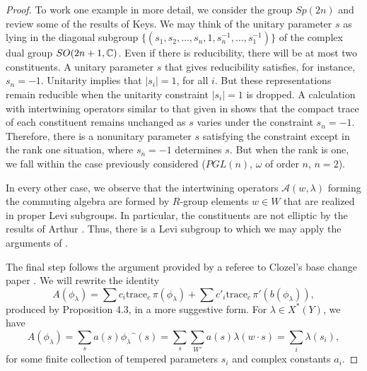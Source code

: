 \documentclass{amsart}
\begin{document}
\begin{proof}
To work one example in more detail, we consider the group $Sp(2n)$
and review some of the results of Keys.
We may
think of the unitary parameter $s$ as lying in the diagonal subgroup
$\{(s_1,s_2,\dots,s_n,1,s_n^{-1},\dots,s_1^{-1})\}$ of
the complex dual group $SO(2n+1,{\Bbb C})$. 
Even if there is reducibility, there will be at most
two constituents.
A unitary
parameter $s$ that gives reducibility satisfies, for instance, $s_n=-1$.
Unitarity implies that
$|s_i|=1$, for all $i$.  But these representations remain
reducible when the unitarity constraint $|s_i| = 1$ is dropped.
A calculation with intertwining operators similar to that
given in \cite{H1,2} shows that the compact trace of each constituent remains 
unchanged as $s$ varies under the constraint $s_n=-1$.
Therefore, there is a nonunitary parameter
$s$ satisfying the constraint except in the rank one situation, where
$s_n=-1$ determines $s$. 
But when the rank is one,
we fall within the case previously considered ($PGL(n)$, $\omega$
of order $n$,
$n=2$).

In every other case, we observe that the intertwining
operators ${\mathcal A}(w,\lambda)$ forming the commuting algebra are
formed by $R$-group elements $w\in W$
that are realized in proper Levi subgroups. In particular,
the constituents
are not elliptic by the results of Arthur \cite{A2}.  
Thus, there is a Levi subgroup
to which we may apply the arguments of \cite{H1,2}.

The final step follows the argument provided by a referee to Clozel's
base change paper \cite{Cl2,p.257}.  
We will rewrite the
identity
$$A(\phi_\lambda) = \sum c_i \text{trace}_c\,\pi(\phi_\lambda)
    + \sum c'_i \text{trace}_c \,\pi'(b(\phi_\lambda)),$$
produced
    by Proposition 4.3, in a more suggestive form.
For $\lambda\in X^*(Y)$, we have
$$A(\phi_\lambda) = \sum_s a(s) \phi_\lambda\hat{\phantom o}(s)
 = \sum_s \sum_{W'} a(s) \lambda(w\cdot s) 
 = \sum_i \lambda(s_i),$$ for some finite collection
of tempered parameters $s_i$ and complex constants $a_i$.


\end{proof}
\end{document}
